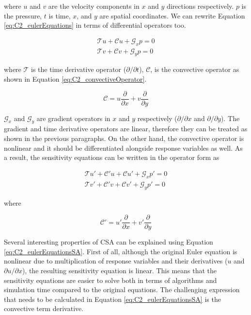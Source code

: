 where $u$ and $v$ are the velocity components in $x$ and $y$ directions respectively. $p$ is the pressure, $t$ is time, $x$, and $y$ are spatial coordinates. We can rewrite Equation \eqref{eq:C2_eulerEquations} in terms of differential operators too.

\begin{subequations}
\begin{gather*}
	\mathcal{T} u +
	\mathcal{C} u +
	\mathcal{G}_x p = 0 
	\\
	\mathcal{T} v +
	\mathcal{C} v +
	\mathcal{G}_y p = 0 
\end{gather*}
\end{subequations}

where $\mathcal{T}$ is the time derivative operator ($\partial /\partial t$), $\mathcal{C}$, is the convective operator as shown in Equation \eqref{eq:C2_convectiveOperator}.

\begin{equation}\label{eq:C2_convectiveOperator}
	\mathcal{C} = u \frac{\partial}{\partial x} + v \frac{\partial}{\partial y}
\end{equation}

$\mathcal{G}_x$ and $\mathcal{G}_y$ are gradient operators in $x$ and $y$ respectively ($\partial /\partial x$ and $\partial /\partial y$). The gradient and time derivative operators are linear, therefore they can be treated as shown in the previous paragraphs. On the other hand, the convective operator is nonlinear and it should be differentiated alongside response variables as well. As a result, the sensitivity equations can be written in the operator form as

\begin{subequations}\label{eq:C2_eulerEquationsSA}
\begin{gather}
	\mathcal{T} u' +
	\mathcal{C}' u + \mathcal{C} u' +
	\mathcal{G}_x p' = 0 
	\\
	\mathcal{T} v' +
	\mathcal{C}' v + \mathcal{C} v' +
	\mathcal{G}_y p' = 0 
\end{gather}
\end{subequations}

where

\begin{equation*}
	\mathcal{C}' = u' \frac{\partial}{\partial x} + v' \frac{\partial}{\partial y}
\end{equation*}

Several interesting properties of CSA can be explained using Equation \eqref{eq:C2_eulerEquationsSA}. First of all, although the original Euler equation is nonlinear due to multiplication of response variables and their derivatives ($u$ and $\partial u/\partial x$), the resulting sensitivity equation is linear. This means that the sensitivity equations are easier to solve both in terms of algorithms and simulation time compared to the original equations. The challenging expression that needs to be calculated in Equation \eqref{eq:C2_eulerEquationsSA} is the convective term derivative.

